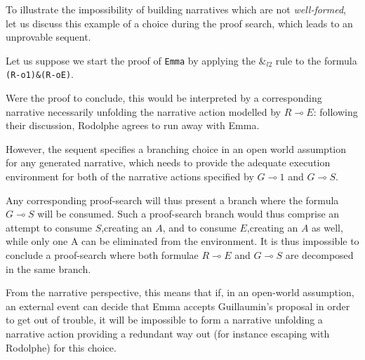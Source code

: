 \documentclass[runningheads,a4paper]{llncs}
\begin{document}
To illustrate the impossibility of building narratives which are not \emph{well-formed}, let us discuss this example of a choice during the proof search, which leads to an unprovable sequent.

Let us suppose we start the proof of \texttt{Emma}
by applying the $\&_{l2}$ rule to the formula \lstinline!(R-o1)&(R-oE)!.

Were the proof to conclude, this would be interpreted by a corresponding narrative necessarily unfolding the narrative action modelled by $R\multimap E$: following their discussion, Rodolphe agrees to run away with Emma.

However, the sequent specifies a branching choice in an open world assumption for any generated narrative, which needs to provide the adequate execution environment for both of the narrative actions specified by $G \multimap 1$ and $G \multimap S$.

Any corresponding proof-search will thus present a branch where the formula $G \multimap S$ will be consumed. Such a proof-search branch would thus comprise an attempt to consume $S$,creating an $A$, and to consume $E$,creating an $A$ as well, while only one A can be eliminated from the environment. It is thus impossible to conclude a proof-search where both formulae $R\multimap E$ and $G\multimap S$ are decomposed in the same branch.

From the narrative perspective, this means that if, in an open-world assumption, an external event can decide that Emma accepts Guillaumin's proposal in order to get out of trouble, it will be impossible to form a narrative unfolding a narrative action providing a redundant way out (for instance escaping with Rodolphe) for this choice.
\end{document}
